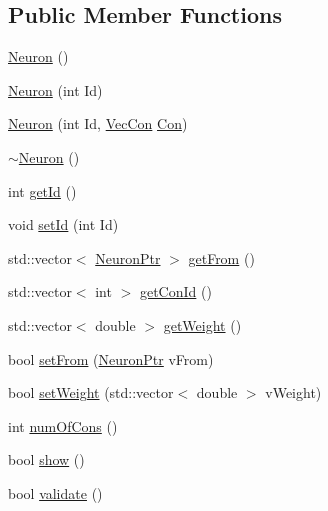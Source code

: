 \subsection*{Public Member Functions}
\begin{DoxyCompactItemize}
\item 
\hyperlink{class_neuron_a823487d01615fadb8ac19a2768dd9d96}{Neuron} ()
\item 
\hyperlink{class_neuron_a05698a11ac18b6cee34d18f63681ddcc}{Neuron} (int Id)
\item 
\hyperlink{class_neuron_af6ba81347cc25d4d5d256dba2c4e441a}{Neuron} (int Id, \hyperlink{class_vec_con}{VecCon} \hyperlink{class_con}{Con})
\item 
\hyperlink{class_neuron_a94a250ce7e167760e593979b899745b1}{$\sim$Neuron} ()
\item 
int \hyperlink{class_neuron_ad9211d55ea50ad6dfbd2676b9e2335e4}{getId} ()
\item 
void \hyperlink{class_neuron_a6eb17a0d297b8c65170911aff37ba968}{setId} (int Id)
\item 
std::vector$<$ \hyperlink{_a_m_o_r_e_8h_ac1ea936c2c7728eb382278131652fef4}{NeuronPtr} $>$ \hyperlink{class_neuron_a66e3800037d2789a8fe7b73996c14f84}{getFrom} ()
\item 
std::vector$<$ int $>$ \hyperlink{class_neuron_aac7d538b4a5087f730ba80f19852bced}{getConId} ()
\item 
std::vector$<$ double $>$ \hyperlink{class_neuron_a3349c0a2053e35afa5b7036bb816f8c6}{getWeight} ()
\item 
bool \hyperlink{class_neuron_a2741d3516b532c0b4af12c1f4ebd3c39}{setFrom} (\hyperlink{_a_m_o_r_e_8h_ac1ea936c2c7728eb382278131652fef4}{NeuronPtr} vFrom)
\item 
bool \hyperlink{class_neuron_ab067bfe507f5386eccc860d4ad2d0bca}{setWeight} (std::vector$<$ double $>$ vWeight)
\item 
int \hyperlink{class_neuron_ae447dce39ed04581609a83d742b585d1}{numOfCons} ()
\item 
bool \hyperlink{class_neuron_a255c3597520c730d798218f7174eff1b}{show} ()
\item 
bool \hyperlink{class_neuron_a95327aa80a9ec949491f214a0c159b5a}{validate} ()
\end{DoxyCompactItemize}

